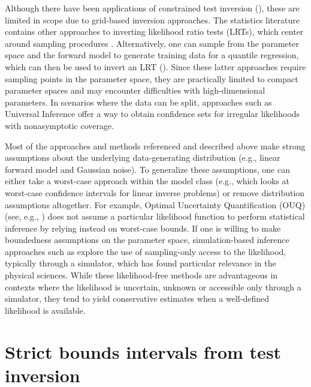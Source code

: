 \documentclass[11pt]{article}
\numberwithin{equation}{section}
\numberwithin{figure}{section}
\begin{document}
Although there have been applications of constrained test inversion (\cite{Feldman_1998}), these are limited in scope due to grid-based inversion approaches. 
The statistics literature contains other approaches to inverting likelihood ratio tests (LRTs), which center around sampling procedures 
\cite{cash1979parameter, venzon1988method, garthwaite_buckland, LikTestInv, neale1997use, schweiger}.
Alternatively, one can sample from the parameter space and the forward model to generate training data for a quantile regression, which can then be used to invert an LRT (\cite{dalmasso2020confidence, waldo,dalmasso2021likelihood, fisher2020efficient}). 
Since these latter approaches require sampling points in the parameter space, they are practically limited to compact parameter spaces and may encounter difficulties with high-dimensional parameters. 
In scenarios where the data can be split, approaches such as Universal Inference \cite{universal_inference} offer a way to obtain confidence sets for irregular likelihoods with nonasymptotic coverage.


Most of the approaches and methods referenced and described above make strong assumptions about the underlying data-generating distribution (e.g., linear forward model and Gaussian noise).
To generalize these assumptions, one can either take a worst-case approach within the model class (e.g., \cite{donoho1994statistical} which looks at worst-case confidence intervals for linear inverse problems) or remove distribution assumptions altogether. 
For example, Optimal Uncertainty Quantification (OUQ) (see, e.g., \cite{owhadiOUQ}) does not assume a particular likelihood function to perform statistical inference by relying instead on worst-case bounds.
If one is willing to make boundedness assumptions on the parameter space, simulation-based inference approaches such as \cite{LikFree1, LikFree2,dalmasso2020confidence, waldo,dalmasso2021likelihood,cranmer2020frontier,cranmer2016approximating} explore the use of sampling-only access to the likelihood, typically through a simulator, which has found particular relevance in the physical sciences.
While these likelihood-free methods are advantageous in contexts where the likelihood is uncertain, unknown or accessible only through a simulator, they tend to yield conservative estimates when a well-defined likelihood is available.

\section{Strict bounds intervals from test inversion}
\label{sec:data_gen_test_def_inv_arg}
\end{document}
